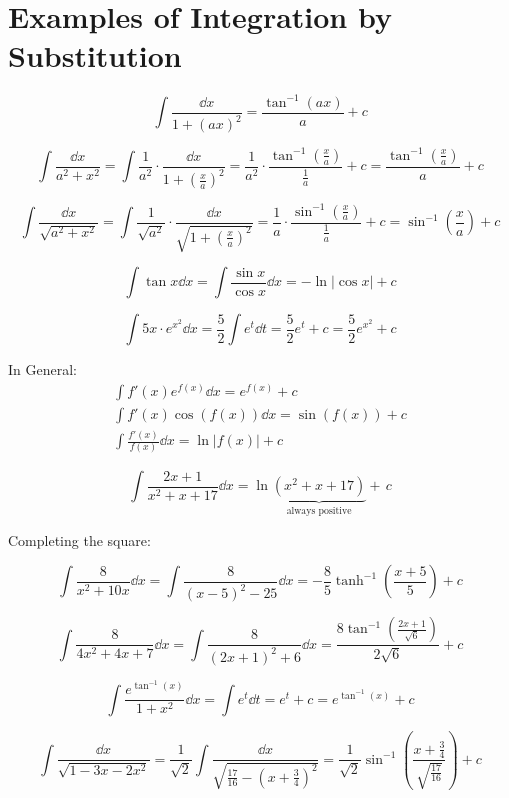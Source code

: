 \documentclass[00_complete]{subfiles}
\begin{document}
\section{Examples of Integration by Substitution}
\setcounter{example}{0}
\begin{example}
    $$\int \frac{\dd{x}}{1+(ax)^2}=\frac{\tan^{-1}(ax)}{a}+c$$
\end{example}
\begin{example}
    $$
    \int \frac{\dd{x}}{a^2+x^2}
    =\int\frac{1}{a^2}\cdot\frac{\dd{x}}{1+\left(\frac{x}{a}\right)^2}
    =\frac{1}{a^2}\cdot\frac{\tan^{-1}\left(\frac{x}{a}\right)}{\frac{1}{a}}+c
    =\frac{\tan^{-1}\left(\frac{x}{a}\right)}{a}+c
    $$
\end{example}
\begin{example}
    $$
    \int \frac{\dd{x}}{\sqrt{a^2+x^2}}
    =\int\frac{1}{\sqrt{a^2}}\cdot\frac{\dd{x}}{\sqrt{1+\left(\frac{x}{a}\right)^2}}
    =\frac{1}{a}\cdot\frac{\sin^{-1}\left(\frac{x}{a}\right)}{\frac{1}{a}}+c
    =\sin^{-1}\left(\frac{x}{a}\right)+c
    $$
\end{example}
\begin{example}
    $$
    \int \tan x \dd{x}
    =\int \frac{\sin x}{\cos x}\dd{x}
    =-\ln|\cos x|+c
    $$
\end{example}
\begin{example}
    $$
    \int 5x\cdot e^{x^2}\dd{x}
    = \frac{5}{2}\int e^t \dd{t}
    =\frac{5}{2}e^t+c
    =\frac{5}{2}e^{x^2}+c
    $$
\end{example}
In General:
\begin{gather}
    \int f'(x)e^{f(x)}\dd{x}=e^{f(x)}+c \\
    \int f'(x)\cos(f(x))\dd{x} = \sin(f(x))+c \\
    \int \frac{f'(x)}{f(x)}\dd{x} = \ln|f(x)|+c
\end{gather}
\begin{example}
    $$
    \int \frac{2x+1}{x^2+x+17}\dd{x}
    =\ln\underbrace{(x^2+x+17)}_{\text{always positive}} +\,c
    $$
\end{example}
Completing the square:
\begin{example}
    $$
    \int \frac{8}{x^2+10x}\dd{x}
    =\int \frac{8}{(x-5)^2-25}\dd{x}
    =-\frac{8}{5}\tanh^{-1}\left(\frac{x+5}{5}\right)+c
    $$
\end{example}
\begin{example}
    $$
    \int \frac{8}{4x^2+4x+7}\dd{x}
    =\int \frac{8}{(2x+1)^2+6}\dd{x}
    =\frac{8\tan^{-1}\left(\frac{2x+1}{\sqrt 6}\right)}{2\sqrt 6}+c
    $$
\end{example}
\begin{example}
    $$
    \int \frac{e^{\tan^{-1}(x)}}{1+x^2}\dd{x}
    =\int e^t \dd{t}
    =e^t+c
    =e^{\tan^{-1}(x)}+c
    $$
\end{example}
\begin{example}
    $$
    \int \frac{\dd{x}}{\sqrt{1-3x-2x^2}}
    =\frac{1}{\sqrt 2}\int
    \frac{\dd{x}}{\sqrt{\frac{17}{16}-\left(x+\frac{3}{4}\right)^2}}
    =\frac{1}{\sqrt
    2}\sin^{-1}\left(\frac{x+\frac{3}{4}}{\sqrt{\frac{17}{16}}}\right)+c
    $$
\end{example}
\end{document}
